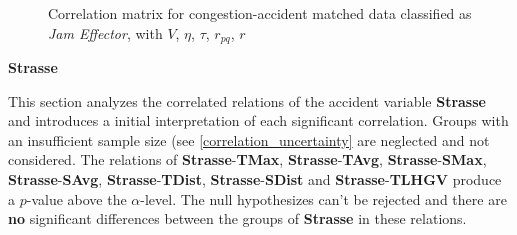 \begin{figure}[!ht]
	\centering
	\caption{Correlation matrix for congestion-accident matched data classified as \textit{Jam Effector}, with $V$, $\eta$, $\tau$, $r_{pq}$, $r$}
	\label{img:correlation_matrix_matched_cramers}
\end{figure}

\large
\centerline{\textbf{Strasse}}
\normalsize
This section analyzes the correlated relations of the accident variable \textbf{Strasse} and introduces a initial interpretation of each significant correlation. Groups with an insufficient sample size (see \cref{correlation_uncertainty} are neglected and not considered. The relations of \textbf{Strasse}-\textbf{TMax}, \textbf{Strasse}-\textbf{TAvg}, \textbf{Strasse}-\textbf{SMax}, \textbf{Strasse}-\textbf{SAvg}, \textbf{Strasse}-\textbf{TDist}, \textbf{Strasse}-\textbf{SDist} and \textbf{Strasse}-\textbf{TLHGV} produce a $p$-value above the $\alpha$-level. The null hypothesizes can't be rejected and there are \textbf{no} significant differences between the groups of \textbf{Strasse} in these relations.

